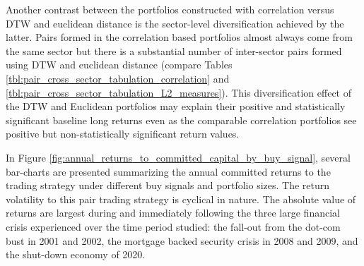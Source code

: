 Another contrast between the portfolios constructed with correlation versus DTW and euclidean distance is the sector-level diversification achieved by the latter. Pairs formed in the correlation based portfolios almost always come from the same sector but there is a substantial number of inter-sector pairs formed using DTW and euclidean distance (compare Tables  \ref{tbl:pair_cross_sector_tabulation_correlation} and \ref{tbl:pair_cross_sector_tabulation_L2_measures}). This diversification effect of the DTW and Euclidean portfolios may explain their positive and statistically significant baseline long returns even as the comparable correlation portfolios see positive but non-statistically significant return values. 

In Figure \ref{fig:annual_returns_to_committed_capital_by_buy_signal}, several bar-charts are presented summarizing the annual committed returns to the trading strategy under different buy signals and portfolio sizes. The return volatility to this pair trading strategy is cyclical in nature. The absolute value of returns are largest during and immediately following the three large financial crisis experienced over the time period studied: the fall-out from the dot-com bust in 2001 and 2002, the mortgage backed security crisis in 2008 and 2009, and the shut-down economy of 2020.

